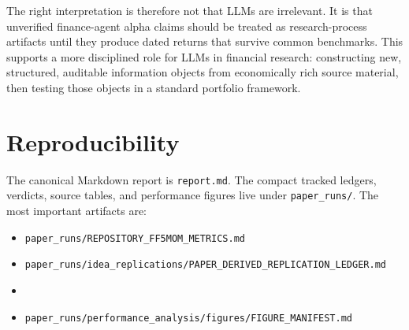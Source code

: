 \documentclass[11pt]{article}
\begin{document}
The right interpretation is therefore not that LLMs are irrelevant. It is that
unverified finance-agent alpha claims should be treated as research-process
artifacts until they produce dated returns that survive common benchmarks. This
supports a more disciplined role for LLMs in financial research: constructing new,
structured, auditable information objects from economically rich source material,
then testing those objects in a standard portfolio framework.

\section{Reproducibility}

The canonical Markdown report is \texttt{report.md}. The compact tracked ledgers,
verdicts, source tables, and performance figures live under \texttt{paper\_runs/}.
The most important artifacts are:
\begin{itemize}
  \item \texttt{paper\_runs/REPOSITORY\_FF5MOM\_METRICS.md}
  \item \texttt{paper\_runs/idea\_replications/PAPER\_DERIVED\_REPLICATION\_LEDGER.md}
  \item {}
  \item \texttt{paper\_runs/performance\_analysis/figures/FIGURE\_MANIFEST.md}
\end{itemize}
\end{document}

